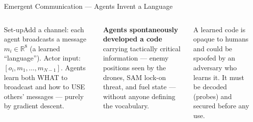 \documentclass[aspectratio=169,10pt,t]{beamer}
\begin{document}
\begin{frame}{Emergent Communication --- Agents Invent a Language}
\begin{columns}[T]
\begin{cbox}{Set-up}\scriptsize Add a channel: each agent broadcasts a message $m_i\in\mathbb{R}^{8}$ (a learned ``language''). Actor input: $[o_i,m_1,\ldots,m_{N-1}]$. Agents learn both WHAT to broadcast and how to USE others' messages --- purely by gradient descent.\end{cbox}
\begin{rbox}\scriptsize\textbf{Agents spontaneously developed a code} carrying tactically critical information --- enemy positions seen by the drones, SAM lock-on threat, and fuel state --- without anyone defining the vocabulary.\end{rbox}
\begin{wbox}\scriptsize A learned code is opaque to humans and could be spoofed by an adversary who learns it. It must be decoded (probes) and secured before any use.\end{wbox}
\end{columns}
\end{frame}
\end{document}
